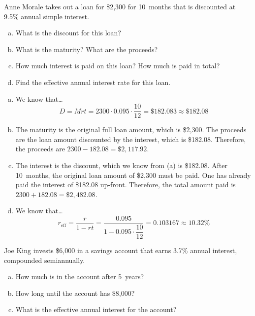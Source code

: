 \documentclass[11pt,letterpaper]{article}
\begin{document}

 Anne Morale takes out a loan for \$2,300 for 10~months that is discounted at 9.5\% annual simple interest.
	\begin{enumerate}[(a)]
	\item What is the discount for this loan?
	\item What is the maturity? What are the proceeds?
	\item How much interest is paid on this loan? How much is paid in total?
	\item Find the effective annual interest rate for this loan.
	\end{enumerate} \pspace

\sol
\begin{enumerate}[(a)]
\item We know that\dots
	\[
	D= Mrt= 2300 \cdot 0.095 \cdot \dfrac{10}{12}= \$182.083 \approx \$182.08
	\] \pspace

\item The maturity is the original full loan amount, which is \$2,300. The proceeds are the loan amount discounted by the interest, which is \$182.08. Therefore, the proceeds are $2300 - 182.08= \$2,117.92$. \pspace

\item The interest is the discount, which we know from (a) is \$182.08. After 10~months, the original loan amount of \$2,300 must be paid. One has already paid the interest of \$182.08 up-front. Therefore, the total amount paid is $2300 + 182.08= \$2,482.08$. \pspace

\item We know that\dots
	\[
	r_{\text{eff}}= \dfrac{r}{1 - rt}= \dfrac{0.095}{1 - 0.095 \cdot \dfrac{10}{12}}= 0.103167 \approx 10.32\%
	\]
\end{enumerate}



\newpage



 Joe King invests \$6,000 in a savings account that earns 3.7\% annual interest, compounded semiannually. 
	\begin{enumerate}[(a)]
	\item How much is in the account after 5~years?
	\item How long until the account has \$8,000?
	\item What is the effective annual interest for the account?
	\end{enumerate} \pspace
\end{document}
